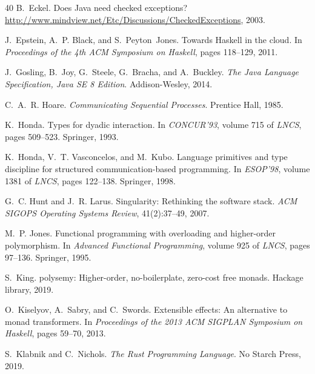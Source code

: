 \documentclass[11pt,twocolumn]{article}
\begin{document}
\begin{thebibliography}{40}
B.~Eckel.
\newblock Does Java need checked exceptions?
\newblock \url{http://www.mindview.net/Etc/Discussions/CheckedExceptions}, 2003.

J.~Epstein, A.~P. Black, and S.~Peyton~Jones.
\newblock Towards Haskell in the cloud.
\newblock In \emph{Proceedings of the 4th ACM Symposium on Haskell}, pages 118--129, 2011.

J.~Gosling, B.~Joy, G.~Steele, G.~Bracha, and A.~Buckley.
\newblock \emph{The Java Language Specification, Java SE 8 Edition}.
\newblock Addison-Wesley, 2014.

C.~A.~R. Hoare.
\newblock \emph{Communicating Sequential Processes}.
\newblock Prentice Hall, 1985.

K.~Honda.
\newblock Types for dyadic interaction.
\newblock In \emph{CONCUR'93}, volume 715 of \emph{LNCS}, pages 509--523. Springer, 1993.

K.~Honda, V.~T. Vasconcelos, and M.~Kubo.
\newblock Language primitives and type discipline for structured communication-based programming.
\newblock In \emph{ESOP'98}, volume 1381 of \emph{LNCS}, pages 122--138. Springer, 1998.

G.~C. Hunt and J.~R. Larus.
\newblock Singularity: Rethinking the software stack.
\newblock \emph{ACM SIGOPS Operating Systems Review}, 41(2):37--49, 2007.

M.~P. Jones.
\newblock Functional programming with overloading and higher-order polymorphism.
\newblock In \emph{Advanced Functional Programming}, volume 925 of \emph{LNCS}, pages 97--136. Springer, 1995.

S.~King.
\newblock polysemy: Higher-order, no-boilerplate, zero-cost free monads.
\newblock Hackage library, 2019.

O.~Kiselyov, A.~Sabry, and C.~Swords.
\newblock Extensible effects: An alternative to monad transformers.
\newblock In \emph{Proceedings of the 2013 ACM SIGPLAN Symposium on Haskell}, pages 59--70, 2013.

S.~Klabnik and C.~Nichols.
\newblock \emph{The Rust Programming Language}.
\newblock No Starch Press, 2019.


\end{thebibliography}
\end{document}
